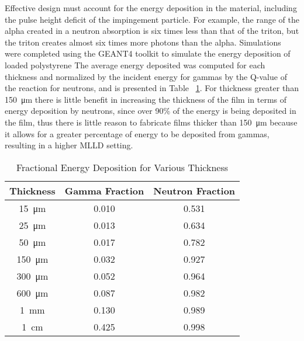 Effective design must account for the energy deposition in the material, including the pulse height deficit of the impingement particle.
For example, the range of the alpha created in a  neutron absorption is six times less than that of the triton, but the triton creates almost six times more photons than the alpha.
Simulations were completed using the GEANT4 toolkit to simulate the energy deposition of  loaded polystyrene
The average energy deposited was computed for each thickness and normalized by the incident energy for gammas by the Q-value of the reaction for neutrons, and is presented in Table ~\ref{tab:ConclusionFractionEDep}.
For thickness greater than \SI{150}{\um} there is little benefit in increasing the thickness of the film in terms of energy deposition by neutrons, since over 90\% of the energy is being deposited in the film, thus there is little reason to fabricate films thicker than \SI{150}{\um} because it allows for a greater percentage of energy to be deposited from gammas, resulting in a higher MLLD setting.
\begin{table}[ht]
    \caption{Fractional Energy Deposition for Various Thickness}
	\centering
	\begin{tabular}{c | c c}
	Thickness & Gamma Fraction & Neutron Fraction \\
	\hline
	\hline
	\SI{15}{\um} & 0.010 & 0.531 \\
	\SI{25}{\um} & 0.013 & 0.634 \\
	\SI{50}{\um} & 0.017 & 0.782 \\
	\SI{150}{\um} & 0.032 & 0.927 \\
	\SI{300}{\um} & 0.052 & 0.964 \\
	\SI{600}{\um} & 0.087 & 0.982 \\
	\SI{1}{\mm} & 0.130 & 0.989 \\
	\SI{1}{\cm} & 0.425 & 0.998 \\
	\end{tabular}
  \label{tab:ConclusionFractionEDep}
\end{table}


